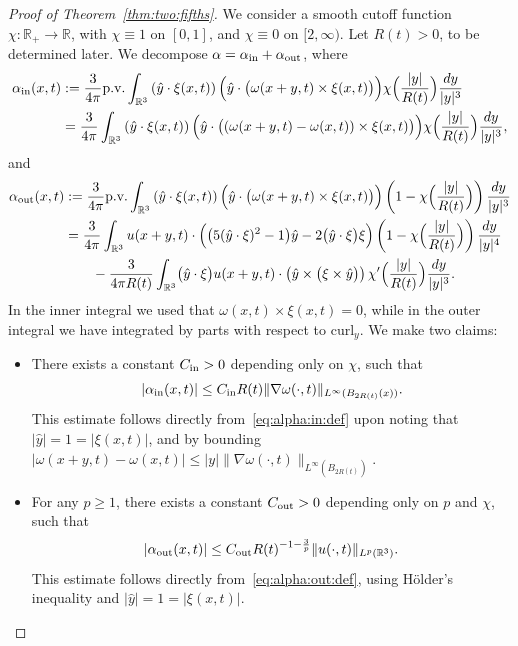 \documentclass[11pt,reqno]{amsproc}
\numberwithin{equation}{section}
\theoremstyle{remark}
\begin{document}
\begin{proof}[Proof of Theorem~\ref{thm:two:fifths}]
We consider a smooth cutoff function $\chi \colon \mathbb{R}_+ \to \mathbb{R}$, with $\chi \equiv 1$ on $[0,1]$, and $\chi \equiv 0$ on $[2,\infty)$. Let $R(t)>0$, to be determined later. 
We decompose $\alpha = \alpha_{\rm in} + \alpha_{\rm out}$, where 
\begin{align}
\alpha_{\rm in}(x,t) 
&:= \frac{3}{4\pi} \text{p.v.} \int_{\mathbb{R}^3} \left(\hat{y} \cdot \xi(x,t)\right)
\Bigl( \hat{y} \cdot \bigl(\omega(x+y,t) \times \xi(x,t)\bigr)\Bigr) \chi\Bigl(\frac{|y|}{R(t)}\Bigr) \frac{dy}{|y|^3}
\notag \\
&= \frac{3}{4\pi}  \int_{\mathbb{R}^3} \left(\hat{y} \cdot \xi(x,t)\right)
\Bigl( \hat{y} \cdot \bigl( (\omega(x+y,t)-\omega(x,t)) \times \xi(x,t)\bigr)\Bigr) \chi\Bigl(\frac{|y|}{R(t)}\Bigr) \frac{dy}{|y|^3}
,
\label{eq:alpha:in:def}
\end{align}
and
\begin{align}
\alpha_{\rm out}(x,t) 
&:= \frac{3}{4\pi} \text{p.v.} \int_{\mathbb{R}^3} \left(\hat{y} \cdot \xi(x,t)\right)
\Bigl( \hat{y} \cdot \bigl(\omega(x+y,t) \times \xi(x,t)\bigr)\Bigr)
\left( 1- \chi\Bigl(\frac{|y|}{R(t)}\Bigr) \right) \frac{dy}{|y|^3}
\notag \\
&= \frac{3}{4\pi} \int_{\mathbb{R}^3}  u(x+y,t) \cdot \Bigl( \bigl(5(\hat{y} \cdot \xi)^2 - 1\bigr) \hat{y} - 2  \bigl(\hat{y} \cdot \xi\bigr) \xi \Bigr) \left( 1-\chi\Bigl(\frac{|y|}{R(t)}\Bigr) \right)\frac{dy}{|y|^4}
 \notag\\
 &\qquad
 -\frac{3}{4\pi R(t)} \int_{\mathbb{R}^3}  \bigl(\hat{y} \cdot \xi\bigr) u(x+y,t) \cdot \left( \hat{y} \times \bigl(\xi \times \hat{y} \bigr) \right)\chi'\Bigl(\frac{|y|}{R(t)}\Bigr)  \frac{dy}{|y|^3}.
 \label{eq:alpha:out:def}
\end{align}
In the inner integral we used that $\omega(x,t) \times \xi(x,t) = 0$, while in the outer integral we have integrated by parts with respect to $\mathrm{curl}_y$.
We make two claims:
\begin{itemize}[leftmargin=2em]  
\item There exists a constant $C_{\rm in}>0$ depending only on $\chi$, such that 
\begin{equation}
|\alpha_{\rm in}(x,t)| \leq C_{\rm in} R(t) \|\nabla \omega(\cdot,t)\|_{L^\infty(B_{2 R(t)}(x))}. 
\label{eq:alpha:in:bound}
\end{equation}
This estimate follows directly from~\eqref{eq:alpha:in:def} upon noting that $|\hat{y}| = 1 = |\xi(x,t)|$, and by bounding $|\omega(x+y,t)-\omega(x,t)|\leq |y| \|\nabla \omega(\cdot,t)\|_{L^\infty(B_{2R(t)})}$.
\item For any $p\geq 1$, there exists a constant $C_{\rm out}>0$ depending only on $p$ and $\chi$, such that 
\begin{equation}
|\alpha_{\rm out}(x,t)| \leq C_{\rm out} R(t)^{-1-\frac{3}{p}} \|u(\cdot,t)\|_{L^p(\mathbb{R}^3)}. 
\label{eq:alpha:out:bound}
\end{equation}
This estimate follows directly from~\eqref{eq:alpha:out:def}, using H\"older's inequality and $|\hat{y}| = 1 = |\xi(x,t)|$.
\end{itemize}



\end{proof}
\end{document}
